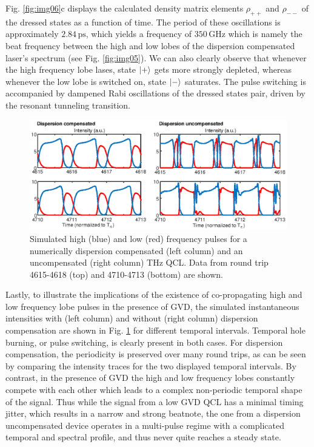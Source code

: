 \documentclass[10pt,letterpaper]{article}%
\begin{document}
Fig. \ref{fig:img06}c displays the calculated density matrix elements
$\rho_{++}$ and $\rho_{--}$ of the dressed states as a function of time. The
period of these oscillations is approximately $2.84{\,}\mathrm{ps}$, which
yields a frequency of $350{\,}\mathrm{GHz}$ which is namely the beat 
frequency between the high and low lobes of the dispersion compensated laser's spectrum
(see Fig. \ref{fig:img05}). We can also clearly observe that whenever the high
frequency lobe lases, state $\Ket{+}$ gets more strongly depleted, whereas
whenever the low lobe is switched on, state $\Ket{-}$ saturates. The pulse
switching is accompanied by dampened Rabi oscillations of the dressed
states pair, driven by the resonant tunneling transition. 

\begin{figure}[h]
\begin{center}
\includegraphics[width=12cm]{figs/TEMPHOLEBURNING.eps}
\end{center}
\caption{Simulated high (blue) and low (red) frequency pulses for a
numerically dispersion compensated (left column) and an uncompensated (right
column) THz QCL. Data from round trip 4615-4618 (top) and
4710-4713 (bottom) are shown.}%
\label{fig:img07}%
\end{figure}

Lastly, to illustrate the implications of the existence of co-propagating high
and low frequency lobe pulses in the presence of GVD, the simulated
instantaneous intensities with (left column) and without (right column)
dispersion compensation are shown in Fig. \ref{fig:img07} for different
temporal intervals. Temporal hole burning, or pulse switching, is clearly
present in both cases. For dispersion compensation, the periodicity is
preserved over many round trips, as can be seen by comparing the intensity
traces for the two displayed temporal intervals. By contrast, in the presence
of GVD the high and low frequency lobes constantly compete with each other
which leads to a complex non-periodic temporal shape of the signal. Thus while
the signal from a low GVD QCL has a minimal timing jitter, which results in a
narrow and strong beatnote, the one from a dispersion uncompensated device
operates in a multi-pulse regime with a complicated temporal and spectral
profile, and thus never quite reaches a steady state.
\end{document}
